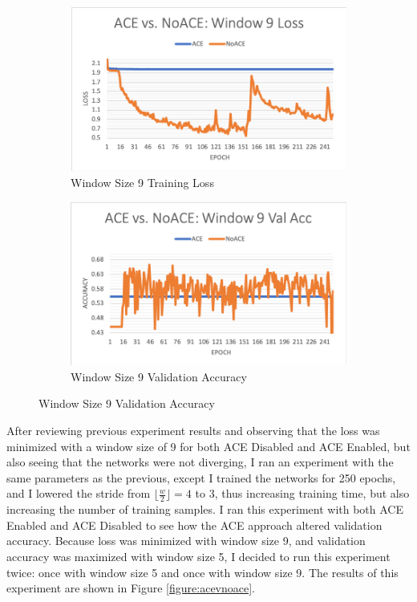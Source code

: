 \documentclass[12pt]{article}
\begin{document}
\begin{figure}[t]
	\begin{subfigure}{0.45\linewidth}
		\includegraphics[width=\linewidth]{acevnoace-window9-loss.png}
		\caption{Window Size 9 Training Loss}
	\end{subfigure}
	\hfill
	\begin{subfigure}{0.45\linewidth}
		\includegraphics[width=\linewidth]{acevnoace-window9-valacc.png}
		\caption{Window Size 9 Validation Accuracy}		
	\end{subfigure}
	

\end{figure}


After reviewing previous experiment results and observing that the loss was minimized with a window size of 9 for both ACE Disabled and ACE Enabled, but also seeing that the networks were not diverging, I ran an experiment with the same parameters as the previous, except I trained the networks for 250 epochs, and I lowered the stride from $\lfloor\frac{w}{2}\rfloor = 4$ to 3, thus increasing training time, but also increasing the number of training samples. 
%
I ran this experiment with both ACE Enabled and ACE Disabled to see how the ACE approach altered validation accuracy. 
%
Because loss was minimized with window size 9, and validation accuracy was maximized with window size 5, I decided to run this experiment twice: once with window size 5 and once with window size 9.
%
The results of this experiment are shown in Figure \ref{figure:acevnoace}.
\end{document}
